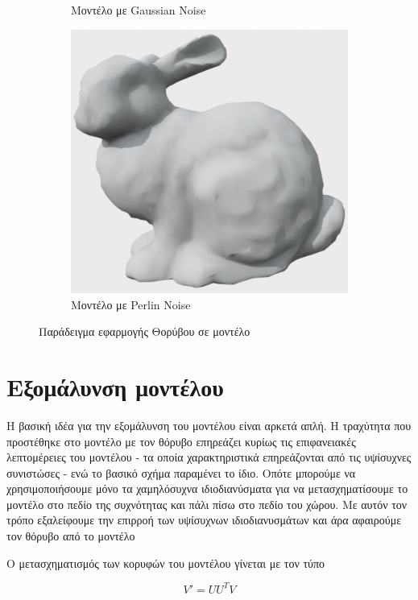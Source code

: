 \documentclass[draft]{article}
\begin{document}
\begin{figure}[h]
\begin{subfigure}{0.4\textwidth}
		\caption{Μοντέλο με Gaussian Noise}
	\end{subfigure}
	\begin{subfigure}{0.4\textwidth}
		\includegraphics[width=\textwidth]{"perlin_noise.png"}
		\caption{Μοντέλο με Perlin Noise}
	\end{subfigure}
	\caption{Παράδειγμα εφαρμογής Θορύβου σε μοντέλο}
	\label{fig:noise}
\end{figure}

\section{Εξομάλυνση μοντέλου}
Η βασική ιδέα για την εξομάλυνση του μοντέλου είναι αρκετά απλή. Η τραχύτητα που
προστέθηκε στο μοντέλο με τον θόρυβο επηρεάζει κυρίως τις επιφανειακές λεπτομέρειες
του μοντέλου - τα οποία χαρακτηριστικά επηρεάζονται από τις υψίσυχνες συνιστώσες -
ενώ το βασικό σχήμα παραμένει το ίδιο. Οπότε μπορούμε να χρησιμοποιήσουμε μόνο τα
χαμηλόσυχνα ιδιοδιανύσματα για να μετασχηματίσουμε το μοντέλο στο πεδίο της συχνότητας και
πάλι πίσω στο πεδίο του χώρου. Με αυτόν τον τρόπο εξαλείφουμε την επιρροή των υψίσυχνων
ιδιοδιανυσμάτων και άρα αφαιρούμε τον θόρυβο από το μοντέλο

Ο μετασχηματισμός των κορυφών του μοντέλου γίνεται με τον τύπο

\[
	V' = UU^TV
\]
\end{document}
